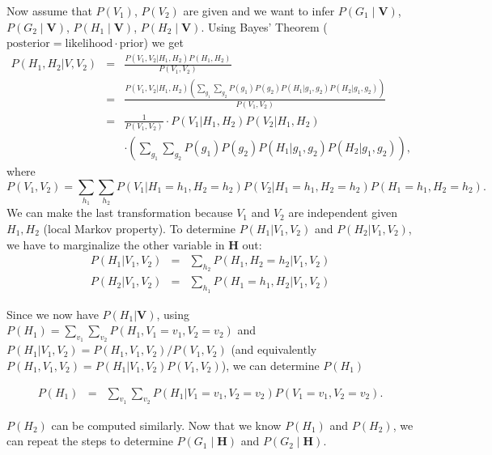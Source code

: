 Now assume that $P(V_{1})$, $P(V_{2})$ are given and we want to
infer $P(G_{1}\mid\mathbf{V})$, $P(G_{2}\mid\mathbf{V})$, $P(H_{1}\mid\mathbf{V})$,
$P(H_{2}\mid\mathbf{V})$. Using Bayes' Theorem ($\mbox{posterior}=\mbox{likelihood}\cdot\mbox{prior}$)
we get
\begin{eqnarray}
P(H_{1},H_{2}|V,V_{2}) & = & \frac{P(V_{1},V_{2}|H_{1},H_{2})P(H_{1},H_{2})}{P(V_{1},V_{2})}\nonumber \\
 & = & \frac{P(V_{1},V_{2}|H_{1},H_{2})\left(\sum_{g_{1}}\sum_{g_{2}}P(g_{1})P(g_{2})P(H_{1}|g_{1},g_{2})P(H_{2}|g_{1},g_{2})\right)}{P(V_{1},V_{2})}\nonumber \\
 & = & \frac{1}{P(V_{1},V_{2})}\cdot P(V_{1}|H_{1},H_{2})P(V_{2}|H_{1},H_{2})\nonumber \\
 &  & \cdot\left(\sum_{g_{1}}\sum_{g_{2}}P(g_{1})P(g_{2})P(H_{1}|g_{1},g_{2})P(H_{2}|g_{1},g_{2})\right),\label{eq:deep-network-conditional-probability}
\end{eqnarray}
where 
\[
P(V_{1},V_{2})=\sum_{h_{1}}\sum_{h_{2}}P(V_{1}|H_{1}=h_{1},H_{2}=h_{2})P(V_{2}|H_{1}=h_{1},H_{2}=h_{2})P(H_{1}=h_{1},H_{2}=h_{2}).
\]
We can make the last transformation because $\ensuremath{V_{1}}$
and $\ensuremath{V_{2}}$ are independent given $\ensuremath{H_{1}},\ensuremath{H_{2}}$
(local Markov property). To determine $P(H_{1}|V_{1},V_{2})$ and
$P(H_{2}|V_{1},V_{2})$, we have to marginalize the other variable
in $\mathbf{H}$ out:
\begin{eqnarray}
P(H_{1}|V_{1},V_{2}) & = & \sum_{h_{2}}P(H_{1},H_{2}=h_{2}|V_{1},V_{2})\nonumber \\
P(H_{2}|V_{1},V_{2}) & = & \sum_{h_{1}}P(H_{1}=h_{1},H_{2}|V_{1},V_{2})\label{eq:deep-network-marginalization}
\end{eqnarray}

Since we now have $P(H_{1}|\mathbf{V})$, using $P(H_{1})=\sum_{v_{1}}\sum_{v_{2}}P(H_{1},V_{1}=v_{1},V_{2}=v_{2})$
and $P(H_{1}|V_{1},V_{2})=P(H_{1},V_{1},V_{2})/P(V_{1},V_{2})$ (and
equivalently $P(H_{1},V_{1},V_{2})=P(H_{1}|V_{1},V_{2})P(V_{1},V_{2})$),
we can determine $P(H_{1})$

\begin{eqnarray*}
P(H_{1}) & = & \sum_{v_{1}}\sum_{v_{2}}P(H_{1}|V_{1}=v_{1},V_{2}=v_{2})P(V_{1}=v_{1},V_{2}=v_{2}).
\end{eqnarray*}

$P(H_{2})$ can be computed similarly. Now that we know $P(H_{1})$
and $P(H_{2})$, we can repeat the steps to determine $P(G_{1}\mid\mathbf{H})$
and $P(G_{2}\mid\mathbf{H})$.

